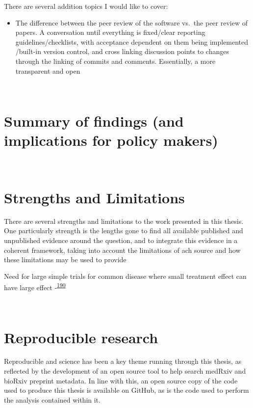 \documentclass[a4paper, twoside]{templates/ociamthesis}
\providecommand{\tightlist}{%
  \setlength{\itemsep}{0pt}\setlength{\parskip}{0pt}}
\begin{document}
There are several addition topics I would like to cover:

\begin{itemize}
\tightlist
\item
  The difference between the peer review of the software vs.~the peer review of papers. A conversation until everything is fixed/clear reporting guidelines/checklists, with acceptance dependent on them being implemented /built-in version control, and cross linking discussion points to changes through the linking of commits and comments. Essentially, a more transparent and open
\end{itemize}

~

\hypertarget{summary-of-findings-and-implications-for-policy-makers}{%
\section{Summary of findings (and implications for policy makers)}\label{summary-of-findings-and-implications-for-policy-makers}}

~

\hypertarget{strengths-and-limitations-2}{%
\section{Strengths and Limitations}\label{strengths-and-limitations-2}}

There are several strengths and limitations to the work presented in this thesis. One particularly strength is the lengths gone to find all available published and unpublished evidence around the question, and to integrate this evidence in a coherent framework, taking into account the limitations of ach source and how these limitations may be used to provide

Need for large simple trials for common disease where small treatment effect can have large effect -\textsuperscript{\protect\hyperlink{ref-yusuf1984}{190}}

~

\hypertarget{reproducible-research}{%
\section{Reproducible research}\label{reproducible-research}}

Reproducible and science has been a key theme running through this thesis, as reflected by the development of an open source tool to help search medRxiv and bioRxiv preprint metadata. In line with this, an open source copy of the code used to produce this thesis is available on GitHub, as is the code used to perform the analysis contained within it.
\end{document}
